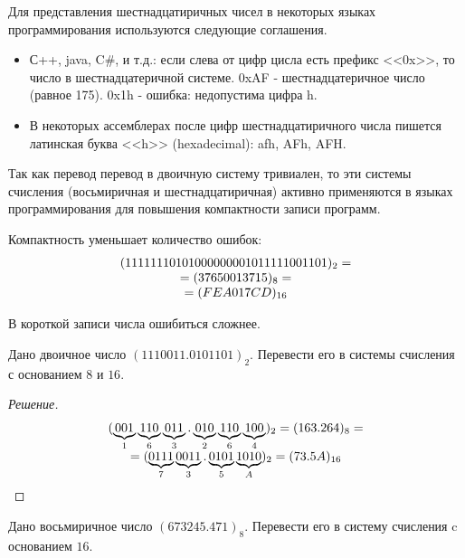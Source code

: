 Для представления шестнадцатиричных чисел в некоторых языках программирования используются следующие соглашения.
\begin{itemize}
    \item С++, java, C\#, и т.д.: если слева от цифр цисла есть префикс <<0x>>, то число в шестнадцатеричной системе. 0xAF - шестнадцатеричное число (равное 175). 0x1h - ошибка: недопустима цифра h.
    
    \item В некоторых ассемблерах после цифр шестнадцатиричного числа пишется латинская буква <<h>> (hexadecimal): afh, AFh, AFH.
\end{itemize}

Так как перевод перевод в двоичную систему тривиален, то эти системы счисления (восьмиричная и шестнадцатиричная) активно применяются в языках программирования для повышения компактности записи программ. 
\begin{exampl} Компактность уменьшает количество ошибок:
    \[
        \begin{array}[c]{c}
            (11111110101000000001011111001101)_2=\\
            =(37650013715)_8=\\
            =(FEA017CD)_{16}
        \end{array}
    \]
    
    В короткой записи числа ошибиться сложнее.
\end{exampl}

\begin{exampl}[Задача]
    Дано двоичное число $(1110011.0101101)_2$. Перевести его в системы счисления с основанием $8$ и $16$.
\end{exampl}

\begin{proof}[Решение]
    \[
        \begin{array}[c]{c}
            (
            \underbrace{001}_{1}
            \underbrace{110}_{6}
            \underbrace{011}_{3}.
            \underbrace{010}_{2}
            \underbrace{110}_{6}
            \underbrace{100}_{4})_2=(163.264)_8=\\
            =(
            \underbrace{0111}_{7}
            \underbrace{0011}_{3}.
            \underbrace{0101}_{5}
            \underbrace{1010}_{A}
            )_2=(73.5A)_{16}
        \end{array}
    \]
\end{proof}

\begin{exampl}[Задача]
    Дано восьмиричное число $(673245.471)_8$. Перевести его в систему счисления c основанием $16$.
\end{exampl}

